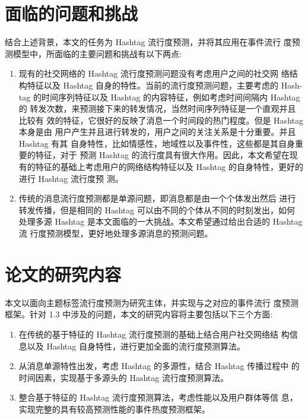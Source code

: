 \section{面临的问题和挑战}
结合上述背景，本文的任务为 Hashtag 流行度预测，并将其应用在事件流行 度预测模型中，所面临的主要问题和挑战有以下两点:
\begin{enumerate}
\item 现有的社交网络的 Hashtag 流行度预测问题没有考虑用户之间的社交网 络结构特征以及 Hashtag 自身的特性。当前的流行度预测问题，主要考虑的 Hash- tag 的时间序列特征以及 Hashtag 的内容特征，例如考虑时间间隔内 Hashtag 的 转发次数，来预测接下来的转发情况，当然时间序列特征是一个直观并且比较有 效的特征，它很好的反映了消息一个时间段的热门程度。但是 Hashtag 本身是由 用户产生并且进行转发的，用户之间的关注关系是十分重要。并且 Hashtag 有其 自身特性，比如情感性，地域性以及事件性，这些都是其自身重要的特征，对于 预测 Hashtag 的流行度具有很大作用。因此，本文希望在现有的特征的基础上考虑用户的网络结构特征以及 Hashtag 的自身特性，更好的进行 Hashtag 流行度预 测。
\item 传统的消息流行度预测都是单源问题，即消息都是由一个个体发出然后 进行转发传播，但是相同的 Hashtag 可以由不同的个体从不同的时刻发出，如何 处理多源 Hashtag 是本文面临的一大挑战。本文希望通过给出合适的 Hashtag 流 行度预测模型，更好地处理多源消息的预测问题。
\end{enumerate}

\section{论文的研究内容}
本文以面向主题标签流行度预测为研究主体，并实现与之对应的事件流行
度预测框架。针对 1.3 中涉及的问题，本文的研究内容将主要包括以下三个方面:
\begin{enumerate}
\item 在传统的基于特征的 Hashtag 流行度预测的基础上结合用户社交网络结 构信息以及 Hashtag 自身特性，进行更加全面的流行度预测算法。
\item 从消息单源特性出发，考虑 Hashtag 的多源性，结合 Hashtag 传播过程中 的时间因素，实现基于多源头的 Hashtag 流行度预测算法。

\item 整合基于特征的 Hashtag 流行度预测算法，考虑性能以及用户群体等信 息，实现完整的具有较高预测性能的事件热度预测框架。
\end{enumerate}



